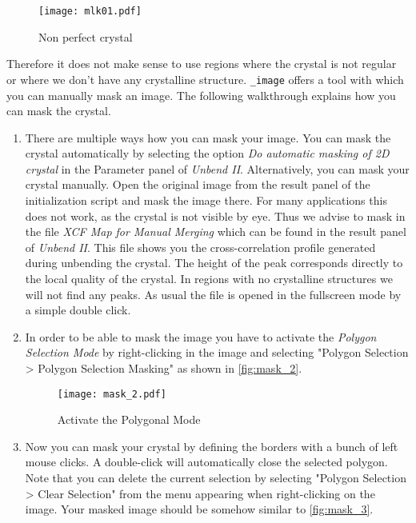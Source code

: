 \begin{figure}[H]
	\centering
	\texttt{[image: mlk01.pdf]}
	\caption{Non perfect crystal}
	\label{fig:mlk01}
\end{figure}

Therefore it does not make sense to use regions where the crystal is not regular or where we don't have any crystalline structure. {\twodx}\texttt{\_image} offers a tool with which you can manually mask an image. The following walkthrough explains how you can mask the crystal.


\begin{enumerate}
	\item There are multiple ways how you can mask your image. You can mask the crystal automatically by selecting the option \textit{Do automatic masking of 2D crystal} in the Parameter panel of  \textit{Unbend II}. 
Alternatively, you can mask your crystal manually.  Open the original image from the result panel of the initialization script and mask the image there. For many applications this does not work, as the crystal is not visible by eye. Thus we advise to mask in the file \textit{XCF Map for Manual Merging} which can be found in the result panel of \textit{Unbend II}. This file shows you the cross-correlation profile generated during unbending the crystal. The height of the peak corresponds directly to the local quality of the crystal. In regions with no crystalline structures we will not find any peaks. As usual the file is opened in the fullscreen mode by a simple double click. 	
	\item In order to be able to mask the image you have to activate the \textit{Polygon Selection Mode} by right-clicking in the image and selecting "Polygon Selection > Polygon Selection Masking" as shown in \autoref{fig:mask_2}.

	\begin{figure}[H]
		\centering
		\texttt{[image: mask\_2.pdf]}
		\caption{Activate the Polygonal Mode}
		\label{fig:mask_2}
	\end{figure}
	
	\item Now you can mask your crystal by defining the borders with a bunch of left mouse clicks. A double-click will automatically close the selected polygon. Note that you can delete the current selection by selecting "Polygon Selection > Clear Selection" from the menu appearing when right-clicking on the image. Your masked image should be somehow similar to \autoref{fig:mask_3}.
	

\end{enumerate}
